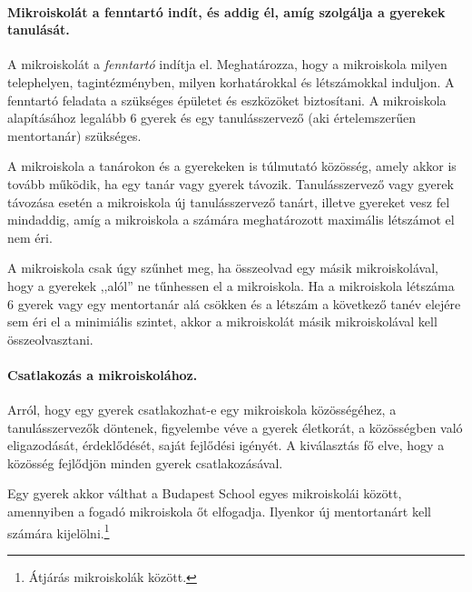\paragraph{Mikroiskolát a fenntartó indít, és addig él, amíg szolgálja a gyerekek tanulását.}
A mikroiskolát a \emph{fenntartó} indítja el. Meghatározza, hogy a mikroiskola milyen telephelyen, tagintézményben, milyen korhatárokkal és létszámokkal induljon. A fenntartó feladata a szükséges épületet és eszközöket biztosítani. A mikroiskola alapításához legalább 6 gyerek és egy tanulásszervező (aki értelemszerűen mentortanár) szükséges.

A mikroiskola a tanárokon és a gyerekeken is túlmutató
közösség,\linebreak
amely akkor is tovább működik, ha egy tanár vagy gyerek távozik. Tanulásszervező vagy gyerek távozása esetén a mikroiskola  új tanulásszervező tanárt, illetve gyereket vesz fel mindaddig, amíg a mikroiskola a számára meghatározott maximális létszámot el nem éri.

A mikroiskola csak úgy szűnhet meg, ha összeolvad egy másik mikroiskolával, hogy a gyerekek ,,alól'' ne tűnhessen el a mikroiskola. Ha a mikroiskola létszáma 6 gyerek vagy egy mentortanár alá csökken és a létszám a következő tanév elejére sem éri el a minimiális szintet, akkor a mikroiskolát másik mikroiskolával kell összeolvasztani.

\paragraph{Csatlakozás a mikroiskolához.}
Arról, hogy egy gyerek csat\-la\-kozhat-e egy mikroiskola közösségéhez, a tanulásszervezők döntenek, figyelembe véve a gyerek életkorát, a közösségben való eligazodását, érdeklődését, saját fejlődési igényét. A kiválasztás fő elve,  hogy a közösség fejlődjön minden gyerek csatlakozásával.

Egy gyerek akkor válthat a Budapest School egyes mikroiskolái között, amennyiben a fogadó mikroiskola őt elfogadja. Ilyenkor új mentortanárt kell számára kijelölni.\footnote{Átjárás mikroiskolák között.}
